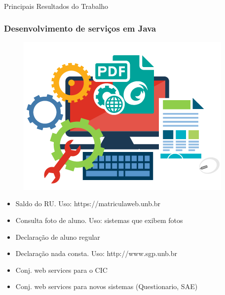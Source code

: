\documentclass{beamer}
\begin{document}
\begin{frame}[c]{ }
\centering
  \huge{Principais Resultados do Trabalho}
\end{frame}



\begin{frame}
  \frametitle{Desenvolvimento de serviços em Java}

	\begin{figure}
	\centering
		\includegraphics[scale=0.2]{img/sdk.png}
	\end{figure}

	  \begin{itemize}
		\item<1->Saldo do RU. Uso: https://matriculaweb.unb.br
	    \item<1->Consulta foto de aluno. Uso: sistemas que exibem fotos
	    \item<1->Declaração de aluno regular
   	    \item<1->Declaração nada consta. Uso: http://www.sgp.unb.br
   	    \item<1->Conj. web services para o CIC
		\item<1->Conj. web services para novos sistemas (Questionario, SAE)
	  \end{itemize}
  
\end{frame}
\end{document}
